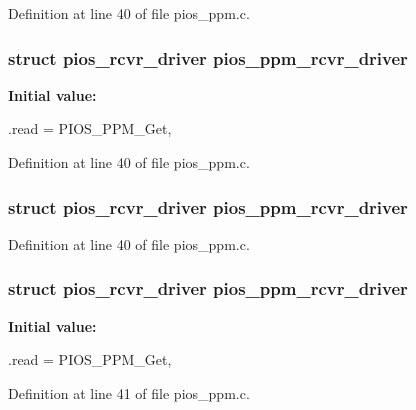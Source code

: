 \-Definition at line 40 of file pios\-\_\-ppm.\-c.

\hypertarget{group___p_i_o_s___p_p_m_ga45134211ce1772871927ca3a1fbc2e20}{
\subsubsection[{pios\-\_\-ppm\-\_\-rcvr\-\_\-driver}]{\setlength{\rightskip}{0pt plus 5cm}struct {\bf pios\-\_\-rcvr\-\_\-driver} {\bf pios\-\_\-ppm\-\_\-rcvr\-\_\-driver}}}\label{group___p_i_o_s___p_p_m_ga45134211ce1772871927ca3a1fbc2e20}
{\bfseries \-Initial value\-:}
\begin{DoxyCode}
 {
        .read = PIOS_PPM_Get,
}
\end{DoxyCode}


\-Definition at line 40 of file pios\-\_\-ppm.\-c.

\hypertarget{group___p_i_o_s___p_p_m_ga45134211ce1772871927ca3a1fbc2e20}{
\subsubsection[{pios\-\_\-ppm\-\_\-rcvr\-\_\-driver}]{\setlength{\rightskip}{0pt plus 5cm}struct {\bf pios\-\_\-rcvr\-\_\-driver} {\bf pios\-\_\-ppm\-\_\-rcvr\-\_\-driver}}}\label{group___p_i_o_s___p_p_m_ga45134211ce1772871927ca3a1fbc2e20}


\-Definition at line 40 of file pios\-\_\-ppm.\-c.

\hypertarget{group___p_i_o_s___p_p_m_ga45134211ce1772871927ca3a1fbc2e20}{
\subsubsection[{pios\-\_\-ppm\-\_\-rcvr\-\_\-driver}]{\setlength{\rightskip}{0pt plus 5cm}struct {\bf pios\-\_\-rcvr\-\_\-driver} {\bf pios\-\_\-ppm\-\_\-rcvr\-\_\-driver}}}\label{group___p_i_o_s___p_p_m_ga45134211ce1772871927ca3a1fbc2e20}
{\bfseries \-Initial value\-:}
\begin{DoxyCode}
 {
        .read = PIOS_PPM_Get,
}
\end{DoxyCode}


\-Definition at line 41 of file pios\-\_\-ppm.\-c.

